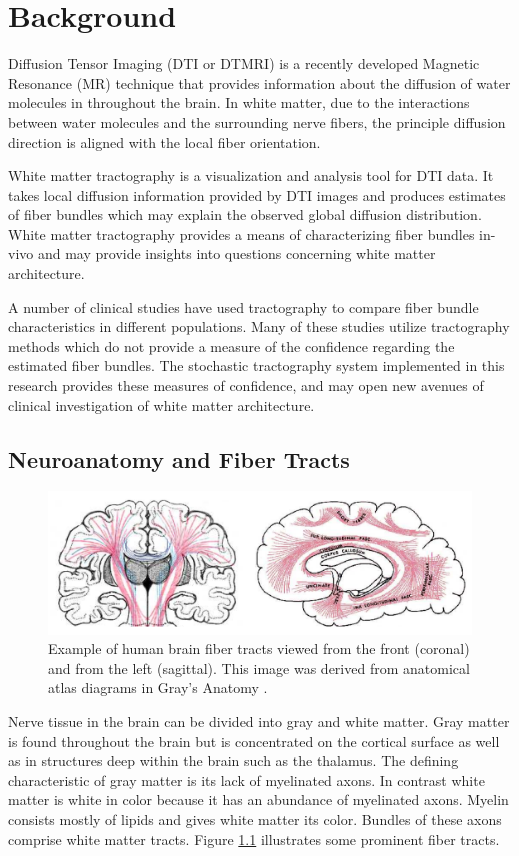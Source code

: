 \chapter{Background}


Diffusion Tensor Imaging (DTI or DTMRI) is a recently developed Magnetic Resonance (MR) technique that provides information about the diffusion of water molecules in throughout the brain.  In white matter, due to the interactions between water molecules and the surrounding nerve fibers, the principle diffusion direction is aligned with the local fiber orientation.

White matter tractography is a visualization and analysis tool for DTI data.  It takes local diffusion information provided by DTI images and produces estimates of fiber bundles which may explain the observed global diffusion distribution.  White matter tractography provides a means of characterizing fiber bundles in-vivo and may provide insights into questions concerning white matter architecture.

A number of clinical studies have used tractography to compare fiber bundle characteristics in different populations.  Many of these studies utilize tractography methods which do not provide a measure of the confidence regarding the estimated fiber bundles.  The stochastic tractography system implemented in this research provides these measures of confidence, and may open new avenues of clinical investigation of white matter architecture.

\section{Neuroanatomy and Fiber Tracts}
\begin{figure} \label{fig:fibertracts}
	\includegraphics[width=\linewidth]{graysfibertracts}
	\caption{Example of human brain fiber tracts viewed from the front (coronal) and from the left (sagittal).  This image was derived from anatomical atlas diagrams in Gray's Anatomy \cite{odonnel06}.}
\end{figure}
Nerve tissue in the brain can be divided into gray and white matter.  Gray matter is found throughout the brain but is concentrated on the cortical surface as well as in structures deep within the brain such as the thalamus.  The defining characteristic of gray matter is its lack of myelinated axons.  In contrast white matter is white in color because it has an abundance of myelinated axons.  Myelin consists mostly of lipids and gives white matter its color.  Bundles of these axons comprise white matter tracts. Figure \ref{fig:fibertracts} illustrates some prominent fiber tracts.

